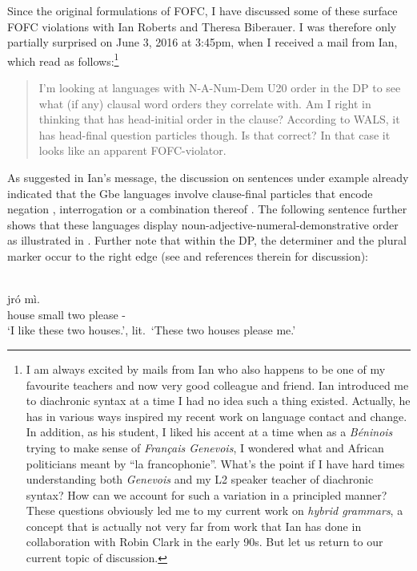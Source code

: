 \documentclass[output=paper]{langsci/langscibook}
\begin{document}
Since the original formulations of FOFC, I have discussed some of these surface
FOFC violations with Ian Roberts and Theresa Biberauer. I was therefore only
partially surprised on June 3, 2016 at 3:45pm, when I received a mail from Ian,
which read as follows:\footnote{I am always excited by mails from Ian who also
    happens to be one of my favourite teachers and now very good colleague and
    friend. Ian introduced me to diachronic syntax at a time I had no idea such
    a thing existed. Actually, he has in various ways inspired my recent work
    on language contact and change. In addition, as his student, I liked his
     accent at a time when as a \emph{Béninois} trying to make sense of
    \emph{Français Genevois}, I wondered what  and African politicians
    meant by \enquote{la francophonie}. What’s the point if I have hard times
    understanding both \emph{Genevois} and my  L2 speaker teacher of
    diachronic syntax? How can we account for such a variation in a principled
    manner? These questions obviously led me to my current work on \emph{hybrid
    grammars}, a concept that is actually not very far from work that Ian has
    done in collaboration with Robin Clark in the early 90s. But let us return
to our current topic of discussion.}

\blockquote{I'm looking at languages with N-A-Num-Dem U20 order in the DP to
    see what (if any) clausal word orders they correlate with. Am I right in
    thinking that  has head-initial order in the clause? According to
    WALS, it has head-final question particles though. Is that correct? In that
    case it looks like an apparent FOFC-violator.}\largerpage[-1]

As suggested in Ian’s message, the discussion on sentences under example
 already indicated that the Gbe languages involve clause-final
particles that encode negation , interrogation
 or a combination thereof . The following
sentence further shows that these languages display
noun-adjective-numeral-demonstrative order as illustrated in .
Further note that within the DP, the determiner and the plural marker occur to
the right edge (see \citealt{Aboh2004a,Aboh2004b} and references therein for
discussion):

\ea\label{ex:aboh:14.4} \\
     jró mì. \\
            {} house small two \Dem{} \Det{} \Pl{} {} please \Fsg-\Acc{} \\
    \glt    \enquote*{I like these two houses.}, lit.\ \enquote*{These
            two houses please me.}
\z
\end{document}
